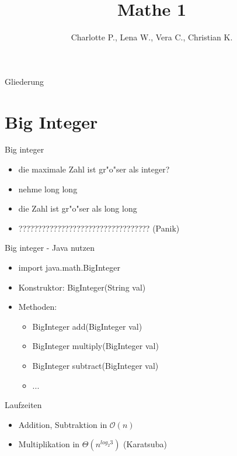 \documentclass[18pt]{beamer}
\title[Mathe 1]{Mathe 1}
\author{Charlotte P., Lena W., Vera C., Christian K.}
\institute{ITI Wagner \& IPD Tichy}
\begin{document}

\begin{frame}
\titlepage
\end{frame}

\begin{frame}{Gliederung}
\tableofcontents
\end{frame}

\section {Big Integer}
\begin{frame}{Big integer}
\begin {itemize}
\item die maximale Zahl ist gr"o"ser als integer?
 
\item nehme long long

\item die Zahl ist gr"o"ser als long long
 
\item ?????????????????????????????????? (Panik) 
\end {itemize}
\end{frame}

\begin{frame}{Big integer - Java nutzen}
\begin {itemize}
\item import java.math.BigInteger
\item Konstruktor: BigInteger(String val)
\item Methoden:
\begin {itemize}
\item BigInteger add(BigInteger val)
\item BigInteger multiply(BigInteger val)
\item BigInteger subtract(BigInteger val)
\item ...
\end {itemize}
\end {itemize}
\end{frame}

\begin{frame} {Laufzeiten}
\begin {itemize}
\item Addition, Subtraktion in $\mathcal{O}(n)$
\item Multiplikation in $\Theta(n^{log_{2}3})$ (Karatsuba)
\end {itemize}
\end{frame}
\end{document}
